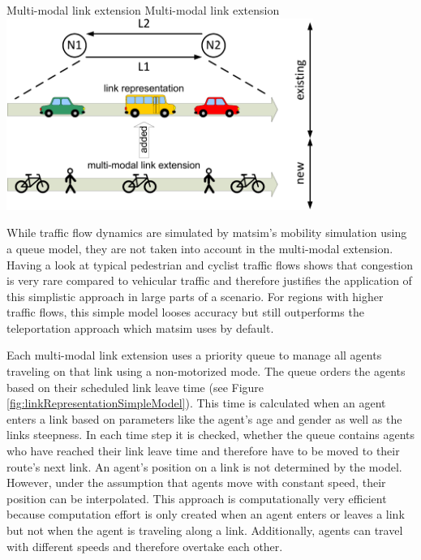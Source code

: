 \createfigure%
{Multi-modal link extension}%
{Multi-modal link extension}%
{\label{fig:multi-modal-link-extension}}%
{\includegraphics[width=0.75\textwidth, angle=0]{extending/figures/MultiModalSimulation/multi-modal-link-extension}}%
{}

While traffic flow dynamics are simulated by \gls{matsim}'s mobility simulation using a queue model, they are not taken into account in the multi-modal extension. Having a look at typical pedestrian and cyclist traffic flows shows that congestion is very rare compared to vehicular traffic and therefore justifies the application of this simplistic approach in large parts of a scenario. For regions with higher traffic flows, this simple model looses accuracy but still outperforms the teleportation approach which \gls{matsim} uses by default.

Each multi-modal link extension uses a priority queue to manage all agents traveling on that link using a non-motorized mode. The queue orders the agents based on their scheduled link leave time (see Figure \ref{fig:linkRepresentationSimpleModel}). This time is calculated when an agent enters a link based on parameters like the agent's age and gender as well as the links steepness. In each time step it is checked, whether the queue contains agents who have reached their link leave time and therefore have to be moved to their route's next link. An agent's position on a link is not determined by the model. However, under the assumption that agents move with constant speed, their position can be interpolated. This approach is computationally very efficient because computation effort is only created when an agent enters or leaves a link but not when the agent is traveling along a link. Additionally, agents can travel with different speeds and therefore overtake each other.

